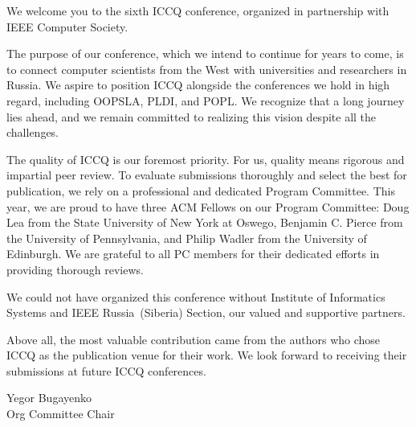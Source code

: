 
\cleardoublepage
{}

\textcolor{red}{}

We welcome you to the sixth ICCQ conference, organized in partnership with IEEE Computer Society.

The purpose of our conference, which we intend to continue for years to come, is to connect computer scientists from the West with universities and researchers in Russia.
We aspire to position ICCQ alongside the conferences we hold in high regard, including OOPSLA, PLDI, and POPL.
We recognize that a long journey lies ahead, and we remain committed to realizing this vision despite all the challenges.

The quality of ICCQ is our foremost priority.
For us, quality means rigorous and impartial peer review.
To evaluate submissions thoroughly and select the best for publication, we rely on a professional and dedicated Program Committee.
This year, we are proud to have three ACM Fellows on our Program Committee:
  Doug Lea from the State University of New York at Oswego,
  Benjamin C. Pierce from the University of Pennsylvania,
  and
  Philip Wadler from the University of Edinburgh.
We are grateful to all PC members for their dedicated efforts in providing thorough reviews.

We could not have organized this conference without  Institute of Informatics Systems and IEEE Russia~(Siberia) Section, our valued and supportive partners.

Above all, the most valuable contribution came from the authors who chose ICCQ as the publication venue for their work.
We look forward to receiving their submissions at future ICCQ conferences.

\vspace{18pt}
Yegor Bugayenko\\
Org Committee Chair
